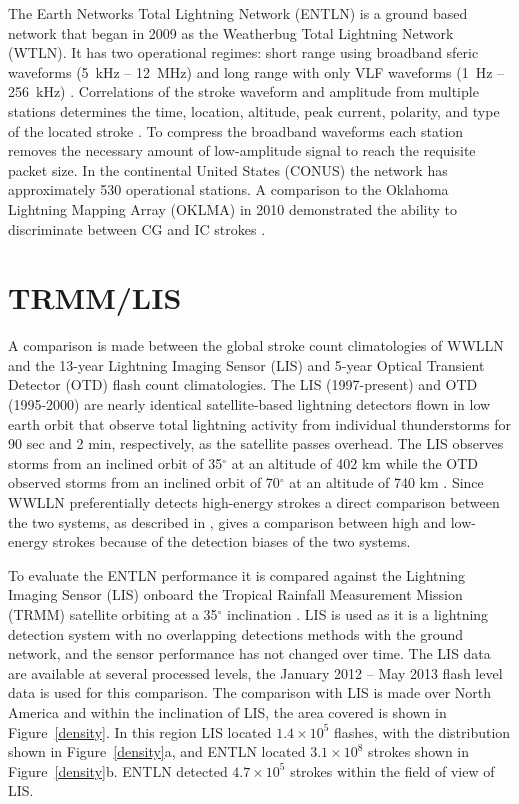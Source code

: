 The Earth Networks Total Lightning Network (ENTLN) is a ground based network that began in 2009 as the Weatherbug Total Lightning Network (WTLN).
It has two operational regimes: short range using broadband sferic waveforms (5~kHz -- 12~MHz) and long range with only VLF waveforms (1~Hz -- 256~kHz) \citep{Heckman2010}.
Correlations of the stroke waveform and amplitude from multiple stations determines the time, location, altitude, peak current, polarity, and type of the located stroke \citep{Liu2011a}.
To compress the broadband waveforms each station removes the necessary amount of low-amplitude signal to reach the requisite packet size.
In the continental United States (CONUS) the network has approximately 530 operational stations.
A comparison to the Oklahoma Lightning Mapping Array (OKLMA) in 2010 demonstrated the ability to discriminate between CG and IC strokes \citep{Beasley2010}.


\section{TRMM/LIS}

A comparison is made between the global stroke count climatologies of WWLLN and the 13-year Lightning Imaging Sensor (LIS) and 5-year Optical Transient Detector (OTD) flash count climatologies. 
The LIS (1997-present) and OTD (1995-2000) are nearly identical satellite-based lightning detectors flown in low earth orbit that observe total lightning activity from individual thunderstorms for 90 sec and 2 min, respectively, as the satellite passes overhead.
The LIS observes storms from an inclined orbit of 35$^\circ$ at an altitude of 402 km while the OTD observed storms from an inclined orbit of 70$^\circ$ at an altitude of 740 km \citep{Christian1999, Christian2003}.
Since WWLLN preferentially detects high-energy strokes \citep{Hutchins2012a} a direct comparison between the two systems, as described in \citet{Virts2013}, gives a comparison between high and low-energy strokes because of the detection biases of the two systems.

To evaluate the ENTLN performance it is compared against the Lightning Imaging Sensor (LIS) onboard the Tropical Rainfall Measurement Mission (TRMM) satellite orbiting at a 35$^\circ$ inclination \citep{Christian1999}.
LIS is used as it is a lightning detection system with no overlapping detections methods with the ground network, and the sensor performance has not changed over time.
The LIS data are available at several processed levels, the January 2012 -- May 2013 flash level data is used for this comparison.
The comparison with LIS is made over North America and within the inclination of LIS, the area covered is shown in Figure~\ref{density}.
In this region LIS located $1.4\times10^5$ flashes, with the distribution shown in Figure~\ref{density}a, and ENTLN located $3.1\times10^8$ strokes shown in Figure~\ref{density}b.
ENTLN detected $4.7\times10^5$ strokes within the field of view of LIS.

